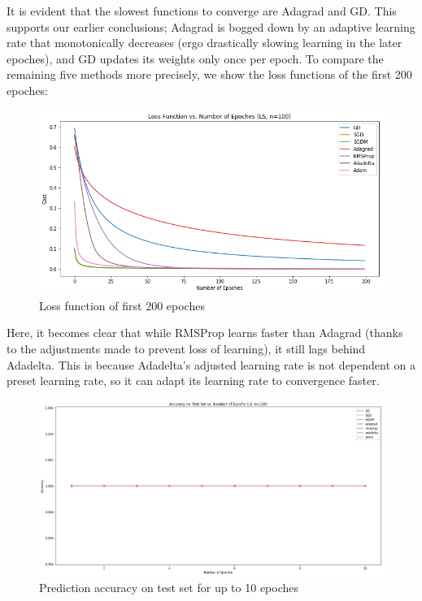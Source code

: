 \documentclass[twoside,11pt]{homework}
\begin{document}
It is evident that the slowest functions to converge are Adagrad and GD. This supports our earlier conclusions; Adagrad is bogged down by an adaptive learning rate that monotonically decreases (ergo drastically slowing learning in the later epoches), and GD updates its weights only once per epoch. To compare the remaining five methods more precisely, we show the loss functions of the first 200 epoches:

	\begin{figure}[H]
		\centering
		\includegraphics[scale=.5]{q5/sep_100/loss_n100.png}
		\caption{Loss function of first 200 epoches}
	\end{figure}

Here, it becomes clear that while RMSProp learns faster than Adagrad (thanks to the adjustments made to prevent loss of learning), it still lags behind Adadelta. This is because Adadelta's adjusted learning rate is not dependent on a preset learning rate, so it can adapt its learning rate to convergence faster.

\begin{figure}[H]
		\centering
		\includegraphics[scale=.3]{q5/sep_100/acc.png}
		\caption{Prediction accuracy on test set for up to 10 epoches}
	\end{figure}
\end{document}

